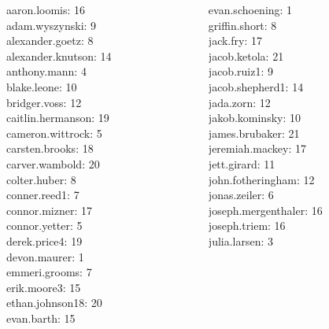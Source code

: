 \documentclass[10pt]{beamer}
\begin{document}
\begin{frame}
\footnotesize 
\vfill 
\begin{columns}
\begin{column}{0.33\textwidth}
aaron.loomis: 16 \\ 
adam.wyszynski: 9 \\ 
alexander.goetz: 8 \\ 
alexander.knutson: 14 \\ 
anthony.mann: 4 \\ 
blake.leone: 10 \\ 
bridger.voss: 12 \\ 
caitlin.hermanson: 19 \\ 
cameron.wittrock: 5 \\ 
carsten.brooks: 18 \\ 
carver.wambold: 20 \\ 
colter.huber: 8 \\ 
conner.reed1: 7 \\ 
connor.mizner: 17 \\ 
connor.yetter: 5 \\ 
derek.price4: 19 \\ 
devon.maurer: 1 \\ 
emmeri.grooms: 7 \\ 
erik.moore3: 15 \\ 
ethan.johnson18: 20 \\ 
evan.barth: 15 \\\end{column}
\begin{column}{0.33\textwidth}
evan.schoening: 1 \\ 
griffin.short: 8 \\ 
jack.fry: 17 \\ 
jacob.ketola: 21 \\ 
jacob.ruiz1: 9 \\ 
jacob.shepherd1: 14 \\ 
jada.zorn: 12 \\ 
jakob.kominsky: 10 \\ 
james.brubaker: 21 \\ 
jeremiah.mackey: 17 \\ 
jett.girard: 11 \\ 
john.fotheringham: 12 \\ 
jonas.zeiler: 6 \\ 
joseph.mergenthaler: 16 \\ 
joseph.triem: 16 \\ 
julia.larsen: 3 \\ 

\end{column}
\end{columns}
\end{frame}
\end{document}
